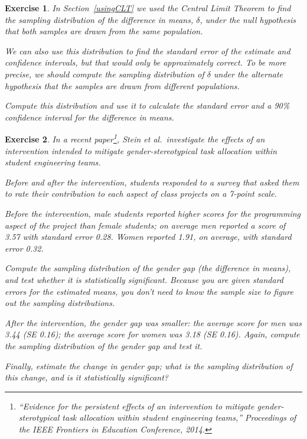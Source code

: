 \documentclass[12pt]{book}
\theoremstyle{exercise}
\newtheorem{exercise}{Exercise}[chapter]
\begin{document}
\begin{exercise}
In Section~\ref{usingCLT} we used the Central Limit Theorem to find
the sampling distribution of the difference in means, $\delta$, under
the null hypothesis that both samples are drawn from the same
population.%
%

We can also use this distribution to find the standard error of the
estimate and confidence intervals, but that would only be
approximately correct.  To be more precise, we should compute the
sampling distribution of $\delta$ under the alternate hypothesis that
the samples are drawn from different populations.%
%
%

Compute this distribution and use it to calculate the standard error
and a 90\% confidence interval for the difference in means.
\end{exercise}


\begin{exercise}
In a recent paper\footnote{``Evidence for the persistent effects of an
  intervention to mitigate gender-sterotypical task allocation within
  student engineering teams,'' Proceedings of the IEEE Frontiers in Education
Conference, 2014.}, Stein et al.~investigate the
effects of an intervention intended to mitigate gender-stereotypical
task allocation within student engineering teams.

Before and after the intervention, students responded to a survey that
asked them to rate their contribution to each aspect of class projects on
a 7-point scale.

Before the intervention, male students reported higher scores for the
programming aspect of the project than female students; on average men
reported a score of 3.57 with standard error 0.28.  Women reported
1.91, on average, with standard error 0.32.%

Compute the sampling distribution of the gender gap (the difference in
means), and test whether it is statistically significant.  Because you
are given standard errors for the estimated means, you don't need to
know the sample size to figure out the sampling distributions.%
%
%

After the intervention, the gender gap was smaller: the average score
for men was 3.44 (SE 0.16); the average score for women was 3.18 (SE
0.16).  Again, compute the sampling distribution of the gender gap and
test it.%

Finally, estimate the change in gender gap; what is the sampling
distribution of this change, and is it statistically significant?%
%
\end{exercise}

\cleardoublepage
{}
{}%
\printindex

\cleardoublepage
\end{document}
